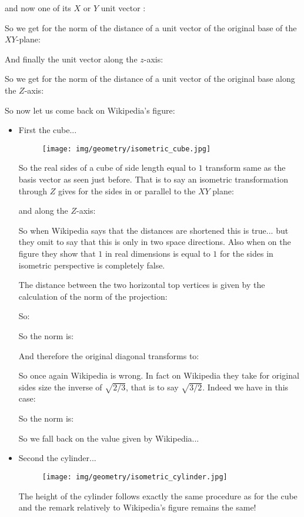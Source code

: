 	and now one of its $X$ or $Y$ unit vector :
	
	So we get for the norm of the distance of a unit vector of the original base of the $XY$-plane:
	
	And finally the unit vector along the $z$-axis:
	
	So we get for the norm of the distance of a unit vector of the original base along the $Z$-axis:
	
	
	\pagebreak
	So now let us come back on Wikipedia's figure:
	\begin{itemize}
		\item First the cube... 
		\begin{figure}[H]
			\centering
			\texttt{[image: img/geometry/isometric\_cube.jpg]}
		\end{figure}
		So the real sides of a cube of side length equal to $1$ transform same as the basis vector as seen just before. That is to say an isometric transformation through $Z$ gives for the sides in or parallel to the $XY$ plane:
		
		and along the $Z$-axis:
		
		So when Wikipedia says that the distances are shortened this is true... but they omit to say that this is only in two space directions. Also when on the figure they show that $1$ in real dimensions is equal to $1$ for the sides in isometric perspective is completely false.
		
		The distance between the two horizontal top vertices is given by the calculation of the norm of the projection:
		
		So:
		
		So the norm is:
		
		And therefore the original diagonal transforms to:
		
		So once again Wikipedia is wrong. In fact on Wikipedia they take for original sides size the inverse of $\sqrt{2/3}$, that is to say $\sqrt{3/2}$. Indeed we have in  this case:
		
		So the norm is:
		
		So we fall back on the value given by Wikipedia...
		
		\item Second the cylinder...
		\begin{figure}[H]
			\centering
			\texttt{[image: img/geometry/isometric\_cylinder.jpg]}
		\end{figure}
		The height of the cylinder follows exactly the same procedure as for the cube and the remark relatively to Wikipedia's figure remains the same! 
		

\end{itemize}
